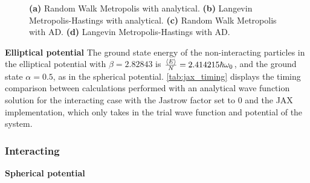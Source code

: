 \begin{figure}[!htb]
\qquad
{}
\caption{\textbf{(a)} Random Walk Metropolis with analytical. \textbf{(b)} Langevin Metropolis-Hastings with analytical. \textbf{(c)} Random Walk Metropolis with AD. \textbf{(d)} Langevin Metropolis-Hastings with AD.}
\label{fig:non-interact_boxplot}
\end{figure}

\textbf{Elliptical potential}
The ground state energy of the non-interacting particles in the elliptical potential with $\beta=2.82843$ is $\frac{\expval{E}}{N}=2.414215\hbar\omega_0$, and the ground state $\alpha=0.5$, as in the spherical potential. \autoref{tab:jax_timing} displays the timing comparison between calculations performed with an analytical wave function solution for the interacting case with the Jastrow factor set to $0$ and the JAX implementation, which only takes in the trial wave function and potential of the system. 



\subsubsection{Interacting}

\textbf{Spherical potential}

